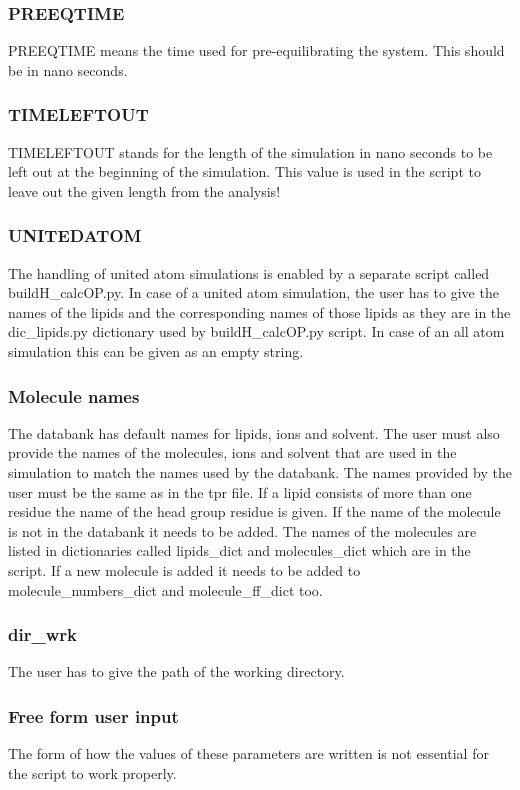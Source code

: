 \documentclass[fleqn,10pt]{wlscirep}
\begin{document}
\subsubsection*{PREEQTIME}
PREEQTIME means the time used for pre-equilibrating the system. This should be in nano seconds. 
\subsubsection*{TIMELEFTOUT}
TIMELEFTOUT stands for the length of the simulation in nano seconds to be left out at the beginning of the simulation. This value is used in the script to leave out the given length from the analysis!

\subsubsection*{UNITEDATOM}
The handling of united atom simulations is enabled by a separate script called buildH\_calcOP.py. In case of a united atom simulation, the user has to give the names of the lipids and the corresponding names of those lipids as they are in the dic\_lipids.py dictionary used by buildH\_calcOP.py script. In case of an all atom simulation this can be given as an empty string.

\subsubsection*{Molecule names}
The databank has default names for lipids, ions and solvent. The user must also provide the names of the molecules, ions and solvent that are used in the simulation to match the names used by the databank. The names provided by the user must be the same as in the tpr file. If a lipid consists of more than one residue the name of the head group residue is given. If the name of the molecule is not in the databank it needs to be added. The names of the molecules are listed in dictionaries called lipids\_dict and molecules\_dict which are in the script. If a new molecule is added it needs to be added to molecule\_numbers\_dict and molecule\_ff\_dict too.

\subsubsection*{dir\_wrk}
The user has to give the path of the working directory.

\subsubsection{Free form user input}
The form of how the values of these parameters are written is not essential for the script to work properly.
\end{document}
